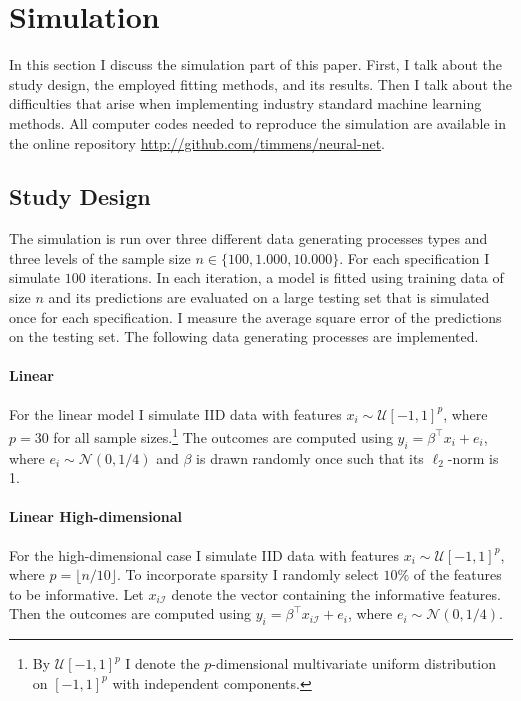 \section{Simulation}
\label{seq:simulation}

In this section I discuss the simulation part of this paper. First, I talk about the
study design, the employed fitting methods, and its results. Then I talk about the
difficulties that arise when implementing industry standard machine learning methods.
All computer codes needed to reproduce the simulation are available in the online
repository \url{http://github.com/timmens/neural-net}.

\subsection{Study Design}

The simulation is run over three different data generating processes types and three
levels of the sample size $n \in \{100, 1.000, 10.000\}$. For each specification I
simulate $100$ iterations. In each iteration, a model is fitted using training data of
size $n$ and its predictions are evaluated on a large testing set that is simulated once
for each specification. I measure the average square error of the predictions on the
testing set. The following data generating processes are implemented.

\paragraph{Linear}

For the linear model I simulate IID data with features $x_i \sim \mathcal{U}[-1, 1]^p$,
where $p = 30$ for all sample sizes.\footnote{By $\mathcal{U}[-1, 1]^p$ I denote the
$p$-dimensional multivariate uniform distribution on $[-1, 1]^p$ with independent
components.} The outcomes are computed using $y_i = \beta^\top x_i + e_i$, where $e_i
\sim \mathcal{N}(0, 1/4)$ and $\beta$ is drawn randomly once such that its $\ell_2$-norm
is 1.

\paragraph{Linear High-dimensional}

For the high-dimensional case I simulate IID data with features $x_i \sim
\mathcal{U}[-1, 1]^p$, where $p = \lfloor n / 10 \rfloor$. To incorporate sparsity I
randomly select $10\%$ of the features to be informative. Let $x_{i\mathcal{I}}$ denote
the vector containing the informative features. Then the outcomes are computed using
$y_i = \beta^\top x_{i\mathcal{I}} + e_i$, where $e_i \sim \mathcal{N}(0, 1/4)$.


